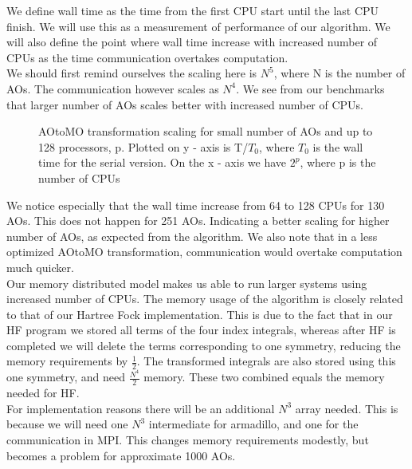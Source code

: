 We define wall time as the time from the first CPU start until the last CPU finish. We will use this as a measurement of performance of our algorithm. We will also define the point where wall time increase with increased number of CPUs as the time communication overtakes computation. \\

We should first remind ourselves the scaling here is $N^5$, where N is the number of AOs. The communication however scales as $N^4$. We see from our benchmarks that larger number of AOs scales better with increased number of CPUs. \\

\begin{figure}[h!]
\begin{center}
\caption{AOtoMO transformation scaling for small number of AOs and up to 128 processors, p. Plotted on y - axis is T/$T_0$, where $T_0$ is the wall time for the serial version. On the x - axis we have $2^p$, where p is the number of CPUs}
\label{fig:aotomo1}
\end{center}
\end{figure}

We notice especially that the wall time increase from 64 to 128 CPUs for 130 AOs. This does not happen for 251 AOs. Indicating a better scaling for higher number of AOs, as expected from the algorithm. We also note that in a less optimized AOtoMO transformation, communication would overtake computation much quicker. \\

Our memory distributed model makes us able to run larger systems using increased number of CPUs. The memory usage of the algorithm is closely related to that of our Hartree Fock implementation. This is due to the fact that in our HF program we stored all terms of the four index integrals, whereas after HF is completed we will delete the terms corresponding to one symmetry, reducing the memory requirements by $\frac{1}{2}$. The transformed integrals are also stored using this one symmetry, and need $\frac{N^4}{2}$ memory. These two combined equals the memory needed for HF. \\

For implementation reasons there will be an additional $N^3$ array needed. This is because we will need one $N^3$ intermediate for armadillo, and one for the communication in MPI. This changes memory requirements  modestly, but becomes a problem for approximate 1000 AOs. \\


